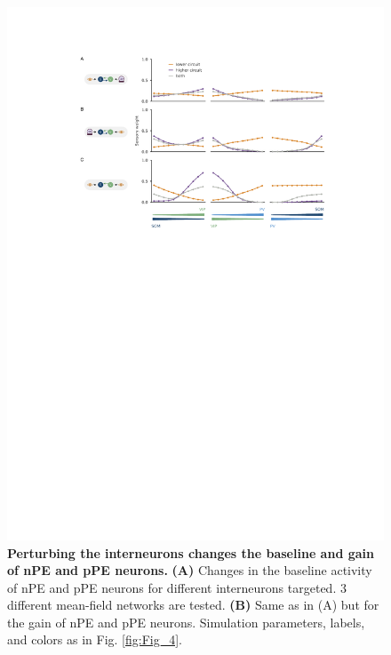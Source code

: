 \documentclass[10pt,a4paper,draft]{article}
\begin{document}
\begin{figure}[!h]
	\centering
    \includegraphics{../results/figures/final/Fig_4_S2}%
\caption{\footnotesize{\bf Perturbing the interneurons changes the baseline and gain of nPE and pPE neurons.\newline}  
{\bf (A)} Changes in the baseline activity of nPE and pPE neurons for different interneurons targeted. 3 different mean-field networks are tested.
{\bf (B)} Same as in (A) but for the gain of nPE and pPE neurons. Simulation parameters, labels, and colors as in Fig. \ref{fig:Fig_4}. 
}
\label{fig:Fig_4_S2}
\end{figure}
\end{document}
